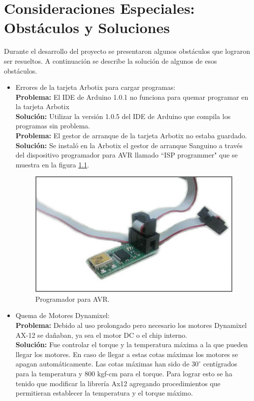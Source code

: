 \chapter{Consideraciones Especiales: Obst\'aculos y Soluciones} \label{chapter:consideraciones}

Durante el desarrollo del proyecto se presentaron algunos obst\'aculos que lograron ser resueltos. A continuación se describe la solución de algunos de esos obstáculos. 
\begin{itemize}
\item Errores de la tarjeta Arbotix para cargar programas:\\
	
	\textbf{Problema:} El \gls{IDE} de Arduino 1.0.1 no funciona para quemar programar en la tarjeta Arbotix \\
  	\textbf{Soluci\'on:} Utilizar la versión 1.0.5 del \gls{IDE} de Arduino  que compila los programas sin problema. \\
	

	 \textbf{Problema:} El gestor de arranque de la tarjeta Arbotix no estaba guardado.\\
	 \textbf{Soluci\'on:}  Se instaló en la Arbotix el gestor de arranque Sanguino a través del    			    dispositivo programador para AVR llamado ``ISP programmer" que se muestra en la figura         \ref{fig:ISPprog}. 

	\begin{figure}[hbtp]
	\centering
	\includegraphics[scale=0.3]{imagenes/ISP.jpg}
	\caption{Programador para AVR.}
	\label{fig:ISPprog}
	\end{figure}
	
	

 \item Quema de Motores Dynamixel:\\

	\textbf{Problema:} Debido al uso prolongado pero necesario los motores Dynamixel AX-12 se dañaban, ya sea el motor \gls{DC} o el chip interno.\\
	\textbf{Soluci\'on:} Fue controlar el torque y la temperatura máxima a la que pueden llegar los motores. En caso de llegar a estas cotas máximas los motores se apagan automáticamente. Las cotas máximas han sido de $30^{\circ}$ centígrados para la temperatura y 800 kgf-cm para el torque. Para lograr esto se ha tenido que modificar la librería Ax12 agregando procedimientos que permitieran establecer la temperatura y el torque máximo.\\


\end{itemize}
